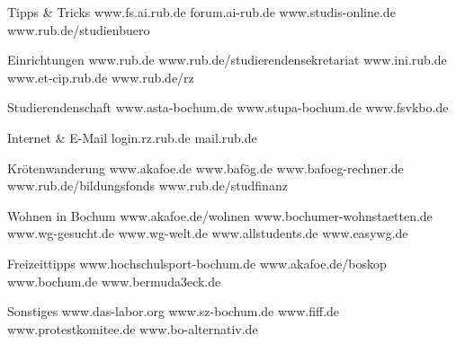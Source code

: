 Tipps & Tricks
	www.fs.ai.rub.de
	forum.ai-rub.de
	www.studis-online.de
	www.rub.de/studienbuero

Einrichtungen 
	www.rub.de
	www.rub.de/studierendensekretariat
	www.ini.rub.de
	www.et-cip.rub.de
	www.rub.de/rz

Studierendenschaft
	www.asta-bochum.de
	www.stupa-bochum.de
	www.fsvkbo.de


Internet & E-Mail
	login.rz.rub.de
	mail.rub.de





Krötenwanderung
	www.akafoe.de
	www.bafög.de
	www.bafoeg-rechner.de
	www.rub.de/bildungsfonds
	www.rub.de/studfinanz

Wohnen in Bochum
	www.akafoe.de/wohnen
	www.bochumer-wohnstaetten.de
	www.wg-gesucht.de
	www.wg-welt.de
	www.allstudents.de
	www.easywg.de

Freizeittipps
	www.hochschulsport-bochum.de
	www.akafoe.de/boskop
	www.bochum.de
	www.bermuda3eck.de

Sonstiges
	www.das-labor.org
	www.sz-bochum.de
	www.fiff.de
	www.protestkomitee.de
	www.bo-alternativ.de